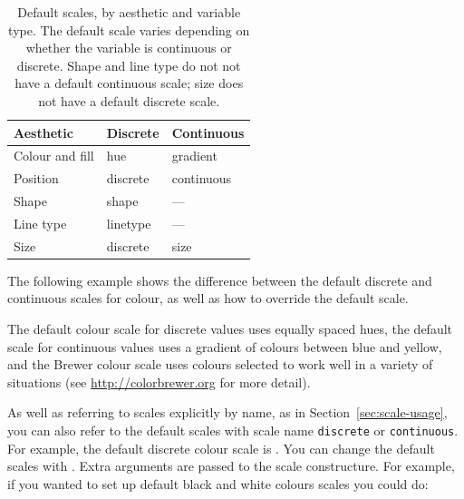 \begin{table}
  \begin{center}
  \begin{tabular}{lll}
    \toprule
    Aesthetic & Discrete & Continuous \\
    \midrule
    Colour and fill & hue & gradient \\
    Position & discrete & continuous \\
    Shape & shape & --- \\
    Line type & linetype & --- \\
    Size & discrete  & size \\
    \bottomrule
  \end{tabular}
  \end{center}
  \caption{Default scales, by aesthetic and variable type.  The default scale varies depending on whether the variable is continuous or discrete.  Shape and line type do not not have a default continuous scale; size does not have a default discrete scale.}
  \label{tbl:default-scales}
\end{table}

The following example shows the difference between the default discrete and continuous scales for colour, as well as how to override the default scale.

% 

The default colour scale for discrete values uses equally spaced hues, the default scale for continuous values uses a gradient of colours between blue and yellow, and the Brewer colour scale uses colours selected to work well in a variety of situations (see \url{http://colorbrewer.org} for more detail).

As well as referring to scales explicitly by name, as in Section~\ref{sec:scale-usage}, you can also refer to the default scales with  scale name {\tt discrete} or {\tt continuous}.  For example, the default discrete colour scale is .  You can change the default scales with .  Extra arguments are passed to the scale constructure.  For example, if you wanted to set up default black and white colours scales you could do:

